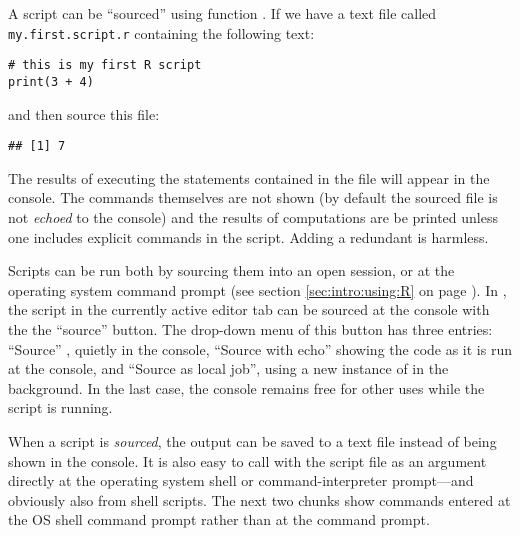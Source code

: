 A script can be ``sourced'' using function . If we have a text file called \texttt{my.first.script.r} containing the following text:
\begin{shaded}
\footnotesize
\begin{verbatim}
# this is my first R script
print(3 + 4)
\end{verbatim}
\end{shaded}

and then source this file:

\begin{knitrout}
\color{fgcolor}\begin{kframe}
\begin{alltt}
\hlstd{(}\hlstd{)}
\end{alltt}
\begin{verbatim}
## [1] 7
\end{verbatim}
\end{kframe}
\end{knitrout}

The results of executing the statements contained in the file will appear in the console. The commands themselves are not shown (by default the sourced file is not \emph{echoed} to the console) and the results of computations are be printed unless one includes explicit  commands in the script. Adding a redundant  is harmless.

Scripts can be run both by sourcing them into an open \Rlang session, or at the operating system command prompt (see section \ref{sec:intro:using:R} on page \pageref{sec:intro:using:R}). In \RStudio, the script in the currently active editor tab can be sourced at the \Rlang console with the the ``source'' button.  The drop-down menu of this button has three entries: ``Source'' , quietly in the \Rlang console, ``Source with echo'' showing the code as it is run at the \Rlang console, and ``Source as local job'', using a new instance of \Rlang in the background. In the last case, the \Rlang console remains free for other uses while the script is running.

When a script is \emph{sourced}, the output can be saved to a text file instead of being shown in the console. It is also easy to call \Rpgrm with the \Rlang script file as an argument directly at the operating system shell or command-interpreter prompt---and obviously also from shell scripts. The next two chunks show commands entered at the OS shell command prompt rather than at the \Rlang command prompt.

